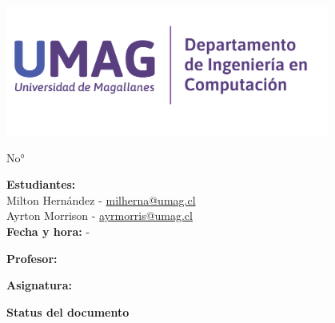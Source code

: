 \begin{titlepage}
    \centering
    \begin{center}
        \includegraphics[width=0.8\textwidth]{src/images/Depto_compu.png}
    \end{center}
    \vspace{0.01cm}
    {\LARGE\bfseries \doctitle \par}
    {\large\doctype No° \docnumber\par}
    \vspace{1.5cm}
    {\large \textbf{Estudiantes:}} \\
    Milton Hernández - \href{mailto:milherna@umag.cl}{milherna@umag.cl}\\
    Ayrton Morrison - \href{mailto:aymorris@umag.cl}{ayrmorris@umag.cl} \\
    \vspace{0.3cm}
    \textbf{Fecha y hora:} {\docdate - \doctime} \\
    \vspace{0.3cm}
    {\large \textbf{Profesor:} \docprofessor \par}
    \vspace{0.3cm}
    {\large \textbf{Asignatura:} \docsubject \par}
    \vspace{1cm}
    {\LARGE\bfseries Status del documento \par}
    
    \vfill
\end{titlepage}